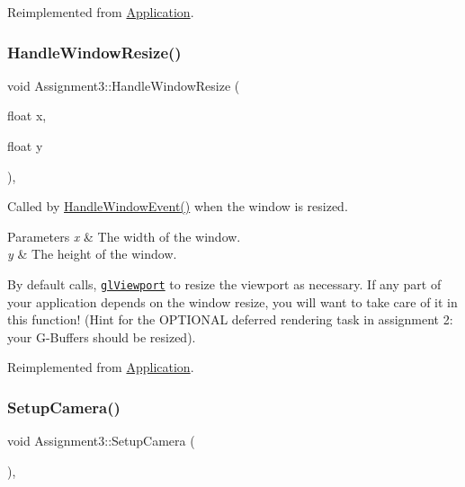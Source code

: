 Reimplemented from \hyperlink{class_application_ae6074c3f102de1cb2fe4c81b545679db}{Application}.

\hypertarget{class_assignment3_a851c637c83c8092d8adfb5c9f761daeb}{}\label{class_assignment3_a851c637c83c8092d8adfb5c9f761daeb}
\subsubsection{\texorpdfstring{Handle\+Window\+Resize()}{HandleWindowResize()}}
{\footnotesize\ttfamily void Assignment3\+::\+Handle\+Window\+Resize (\begin{DoxyParamCaption}\item[{float}]{x,  }\item[{float}]{y }\end{DoxyParamCaption})\hspace{0.3cm}{\ttfamily [protected]}, {\ttfamily [virtual]}}



Called by \hyperlink{class_application_a74d92db64e051efa56d0357989dcb755}{Handle\+Window\+Event()} when the window is resized.


\begin{DoxyParams}{Parameters}
{\em x} & The width of the window. \\
\hline
{\em y} & The height of the window.\\
\hline
\end{DoxyParams}
By default calls, \href{https://www.opengl.org/sdk/docs/man/html/glViewport.xhtml}{\tt gl\+Viewport} to resize the viewport as necessary. If any part of your application depends on the window resize, you will want to take care of it in this function! (Hint for the O\+P\+T\+I\+O\+N\+AL deferred rendering task in assignment 2\+: your \textquotesingle{}G-\/\+Buffers\textquotesingle{} should be resized).

Reimplemented from \hyperlink{class_application_abdba284a0f075ee1d4a2108c3a5236a2}{Application}.

\hypertarget{class_assignment3_a1d23eb19973b78e516169f4a03954526}{}\label{class_assignment3_a1d23eb19973b78e516169f4a03954526}
\subsubsection{\texorpdfstring{Setup\+Camera()}{SetupCamera()}}
{\footnotesize\ttfamily void Assignment3\+::\+Setup\+Camera (\begin{DoxyParamCaption}{ }\end{DoxyParamCaption})\hspace{0.3cm}{\ttfamily [private]}, {\ttfamily [virtual]}}



